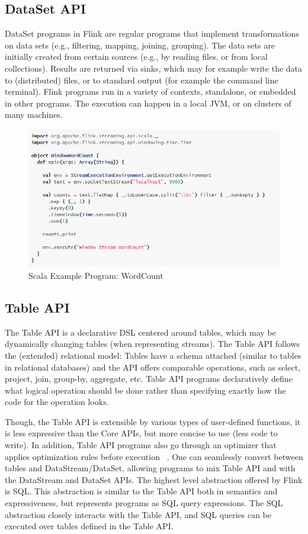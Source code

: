 \documentclass[9pt,twocolumn,twoside]{styles/osajnl}
\begin{document}
\subsection{DataSet API}

DataSet programs in Flink are regular programs that implement transformations on data sets (e.g., filtering, mapping, joining, grouping). The data sets are initially created from certain sources (e.g., by reading files, or from local collections).
Results are returned via sinks, which may for example write the data to (distributed) files, or to standard output (for example the command line terminal). Flink programs run in a variety of contexts, standalone, or embedded in other programs. The execution can happen in a local JVM, or on clusters of many machines.

\begin{figure}[H]
 \centering
\includegraphics[scale=0.5]{images/image8}
\caption{Scala Example Program: WordCount  ~\cite{www-flink}}
\end{figure}

\subsection{ Table API}

The Table API is a declarative DSL centered around tables, which may be dynamically changing tables (when representing streams). The Table API follows the (extended) relational model: Tables have a schema attached (similar to tables in relational databases) and the API offers comparable operations, such as select, project, join, group-by, aggregate, etc. Table API programs declaratively define what logical operation should be done rather than specifying exactly how the code for the operation looks.

Though, the Table API is extensible by various types of user-defined functions, it is less expressive than the Core APIs, but more concise to use (less code to write). In addition, Table API programs also go through an optimizer that applies optimization rules before execution ~\cite{article-flink}. One can seamlessly convert between tables and DataStream/DataSet, allowing programs to mix Table API and with the DataStream and DataSet APIs. The highest level abstraction offered by Flink is SQL. This abstraction is similar to the Table API both in semantics and expressiveness, but represents programs as SQL query expressions. The SQL abstraction closely interacts with the Table API, and SQL queries can be executed over tables defined in the Table API.
\end{document}
